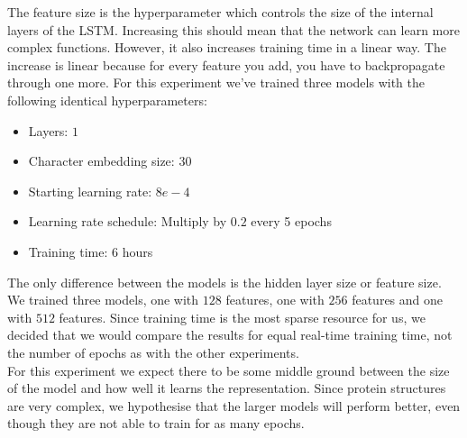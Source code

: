 The feature size is the hyperparameter which controls the size of the internal layers of the LSTM. Increasing this should mean that the network can learn more complex functions. However, it also increases training time in a linear way. The increase is linear because for every feature you add, you have to backpropagate through one more. For this experiment we've trained three models with the following identical hyperparameters:
\begin{itemize}
	\item Layers: $1$
	\item Character embedding size: 30
	\item Starting learning rate: $8e-4$
	\item Learning rate schedule: Multiply by $0.2$ every 5 epochs
	\item Training time: 6 hours
\end{itemize}
The only difference between the models is the hidden layer size or feature size. We trained three models, one with $128$ features, one with $256$ features and one with $512$ features. Since training time is the most sparse resource for us, we decided that we would compare the results for equal real-time training time, not the number of epochs as with the other experiments.\\

\noindent
For this experiment we expect there to be some middle ground between the size of the model and how well it learns the representation. Since protein structures are very complex, we hypothesise that the larger models will perform better, even though they are not able to train for as many epochs.